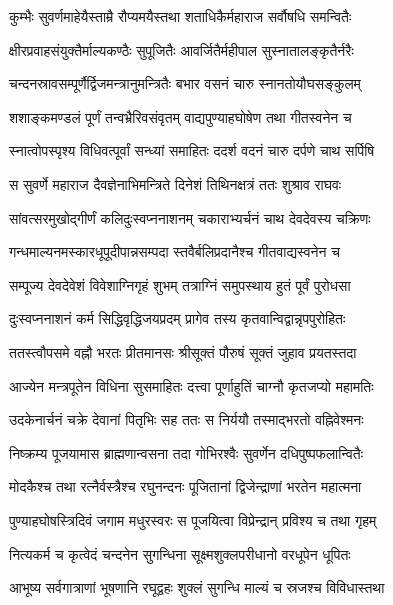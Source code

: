 \twolineshloka
{कुम्भैः सुवर्णमाहेयैस्ताम्रै रौप्यमयैस्तथा}
{शताधिकैर्महाराज सर्वौषधि समन्वितैः}%

\twolineshloka
{क्षीरप्रवाहसंयुक्तैर्माल्यकण्ठैः सुपूजितैः}
{आवर्जितैर्महीपाल सुस्नातालङ्कृतैर्नरैः}%

\twolineshloka
{चन्दनस्रावसम्पूर्णैर्द्विजमन्त्रानुमन्त्रितैः}
{बभार वसनं चारु स्नानतोयौघसङ्कुलम्}%

\twolineshloka
{शशाङ्कमण्डलं पूर्णं तन्वभ्रैरिवसंवृतम्}
{वाद्यपुण्याहघोषेण तथा गीतस्वनेन च} %

\twolineshloka
{स्नात्वोपस्पृश्य विधिवत्पूर्वां सन्ध्यां समाहितः}
{ददर्श वदनं चारु दर्पणे चाथ सर्पिषि}%

\twolineshloka
{स सुवर्णे महाराज दैवज्ञेनाभिमन्त्रिते}
{दिनेशं तिथिनक्षत्रं ततः शुश्राव राघवः}%

\twolineshloka
{सांवत्सरमुखोद्गीर्णं कलिदुःस्वप्ननाशनम्}
{चकाराभ्यर्चनं चाथ देवदेवस्य चक्रिणः}%

\twolineshloka
{गन्धमाल्यनमस्कारधूपूदीपान्नसम्पदा}
{स्तवैर्बलिप्रदानैश्च गीतवाद्यस्वनेन च}%

\twolineshloka
{सम्पूज्य देवदेवेशं विवेशाग्निगृहं शुभम्}
{तत्राग्निं समुपस्थाय हुतं पूर्वं पुरोधसा}%

\twolineshloka
{दुःस्वप्ननाशनं कर्म सिद्धिवृद्धिजयप्रदम्}
{प्रागेव तस्य कृतवान्विद्वान्नृपपुरोहितः}%

\twolineshloka
{ततस्त्वौपसमे वह्नौ भरतः प्रीतमानसः}
{श्रीसूक्तं पौरुषं सूक्तं जुहाव प्रयतस्तदा}%

\twolineshloka
{आज्येन मन्त्रपूतेन विधिना सुसमाहितः}
{दत्त्वा पूर्णाहुतिं चाग्नौ कृतजप्यो महामतिः}%

\twolineshloka
{उदकेनार्चनं चक्रे देवानां पितृभिः सह}
{ततः स निर्ययौ तस्माद्भरतो वह्निवेश्मनः}%

\twolineshloka
{निष्क्रम्य पूजयामास ब्राह्मणान्वसना तदा}
{गोभिरश्वैः सुवर्णेन दधिपुष्पफलान्वितैः} %

\twolineshloka
{मोदकैश्च तथा रत्नैर्वस्त्रैश्च रघुनन्दनः}
{पूजितानां द्विजेन्द्राणां भरतेन महात्मना}%

\twolineshloka
{पुण्याहघोषस्त्रिदिवं जगाम मधुरस्वरः}
{स पूजयित्वा विप्रेन्द्रान् प्रविश्य च तथा गृहम्}%

\twolineshloka
{नित्यकर्म च कृत्वेदं चन्दनेन सुगन्धिना}
{सूक्ष्मशुक्लपरीधानो वरधूपेन धूपितः}%

\twolineshloka
{आभूष्य सर्वगात्राणां भूषणानि रघूद्वहः}
{शुक्लं सुगन्धि माल्यं च स्रजश्च विविधास्तथा}%

